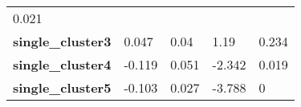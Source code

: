 \documentclass[]{article}
\begin{document}
\begin{longtable}[c]{@{}lllll@{}}
\begin{minipage}[t]{0.12\columnwidth}
0.021
\strut\end{minipage}\tabularnewline
\begin{minipage}[t]{0.31\columnwidth}\raggedright\strut
\textbf{single\_cluster3}
\strut\end{minipage} &
\begin{minipage}[t]{0.13\columnwidth}\raggedright\strut
0.047
\strut\end{minipage} &
\begin{minipage}[t]{0.16\columnwidth}\raggedright\strut
0.04
\strut\end{minipage} &
\begin{minipage}[t]{0.12\columnwidth}\raggedright\strut
1.19
\strut\end{minipage} &
\begin{minipage}[t]{0.12\columnwidth}\raggedright\strut
0.234
\strut\end{minipage}\tabularnewline
\begin{minipage}[t]{0.31\columnwidth}\raggedright\strut
\textbf{single\_cluster4}
\strut\end{minipage} &
\begin{minipage}[t]{0.13\columnwidth}\raggedright\strut
-0.119
\strut\end{minipage} &
\begin{minipage}[t]{0.16\columnwidth}\raggedright\strut
0.051
\strut\end{minipage} &
\begin{minipage}[t]{0.12\columnwidth}\raggedright\strut
-2.342
\strut\end{minipage} &
\begin{minipage}[t]{0.12\columnwidth}\raggedright\strut
0.019
\strut\end{minipage}\tabularnewline
\begin{minipage}[t]{0.31\columnwidth}\raggedright\strut
\textbf{single\_cluster5}
\strut\end{minipage} &
\begin{minipage}[t]{0.13\columnwidth}\raggedright\strut
-0.103
\strut\end{minipage} &
\begin{minipage}[t]{0.16\columnwidth}\raggedright\strut
0.027
\strut\end{minipage} &
\begin{minipage}[t]{0.12\columnwidth}\raggedright\strut
-3.788
\strut\end{minipage} &
\begin{minipage}[t]{0.12\columnwidth}\raggedright\strut
0
\strut\end{minipage}\tabularnewline

\end{longtable}
\end{document}
